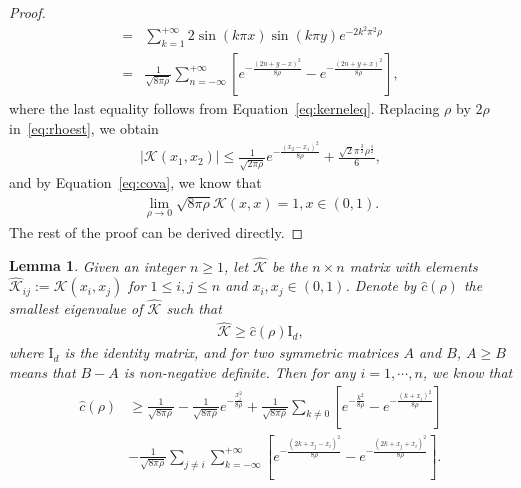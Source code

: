 \documentclass[11pt]{article}
\numberwithin{equation}{section}%
\numberwithin{figure}{section}%
\newtheorem{lemma}[theorem]{Lemma}
\theoremstyle{remark}
\begin{document}
\begin{proof}
\begin{equation}
\begin{split}
				=&\sum_{k=1}^{+\infty}2\sin(k\pi x) \sin(k\pi y)e^{-2k^{2}\pi^{2}\rho}\\
				=&\frac{1}{\sqrt{8\pi\rho}}\sum_{n=-\infty}^{+\infty}\left[e^{-\frac{(2n+y-x)^{2}}{8\rho}}-e^{-\frac{(2n+y+x)^{2}}{8\rho}}\right],
			\end{split}
		\end{equation}
		where the last equality follows from Equation~\eqref{eq:kerneleq}.
		Replacing $\rho$ by $2\rho$ in~\eqref{eq:rhoest}, we obtain 
		\begin{align*}
			|\mathcal{K}(x_{1},x_{2})|\leq \frac{1}{\sqrt{2\pi\rho}}e^{-\frac{(x_{2}-x_{1})^{2}}{8\rho}}+\frac{\sqrt{2}\pi^{\frac{3}{2}}\rho^{\frac{1}{2}}}{6},
		\end{align*}
		and by Equation~\eqref{eq:cova}, we know that
		\begin{align*}
			\lim_{\rho\rightarrow 0}\sqrt{8\pi\rho} \mathcal{K}(x,x)=1,x\in(0,1).
		\end{align*}
		The rest of the proof can be derived directly.
	\end{proof}
	\begin{lemma}\label{lem:lowerbound}
			Given an integer $n\geq 1$, let $\hat{\mathcal{K}}$ be the $n\times n$ matrix with elements $\hat{\mathcal{K}}_{ij}:=\mathcal{K}(x_{i},x_{j})$ for $1\leq i,j\leq n$ and $x_{i},x_{j}\in(0,1)$. Denote by $\hat{c}(\rho)$ the smallest eigenvalue of $\hat{\mathcal{K}}$ such that 
		\begin{align*}
		\hat{\mathcal{K}}\geq \hat{c}(\rho) \text{I}_{d},
		\end{align*}
		where $\text{I}_{d}$ is the identity matrix, and for two symmetric matrices $A$ and $B$, $A\geq B$ means that $B-A$ is non-negative definite. Then for any $i=1,\cdots,n$, we know that
		\begin{equation}\label{eq:lowerbound}
			\begin{split}
				\hat{c}(\rho)&\geq \frac{1}{\sqrt{8\pi\rho}}-\frac{1}{\sqrt{8\pi\rho}}e^{-\frac{x_{i}^{2}}{8\rho}}+ \frac{1}{\sqrt{8\pi\rho}}\sum_{k\neq 0}\left[e^{-\frac{k^{2}}{8\rho}}-e^{-\frac{(k+x_{i})^{2}}{8\rho}}\right]\\
				&- \frac{1}{\sqrt{8\pi\rho}}\sum_{j\neq i}\sum_{k=-\infty}^{+\infty}\left[e^{-\frac{(2k+x_{j}-x_{i})^{2}}{8\rho}}-e^{-\frac{(2k+x_{j}+x_{i})^{2}}{8\rho}}\right].
			\end{split}
		\end{equation}
	\end{lemma}
\end{document}
